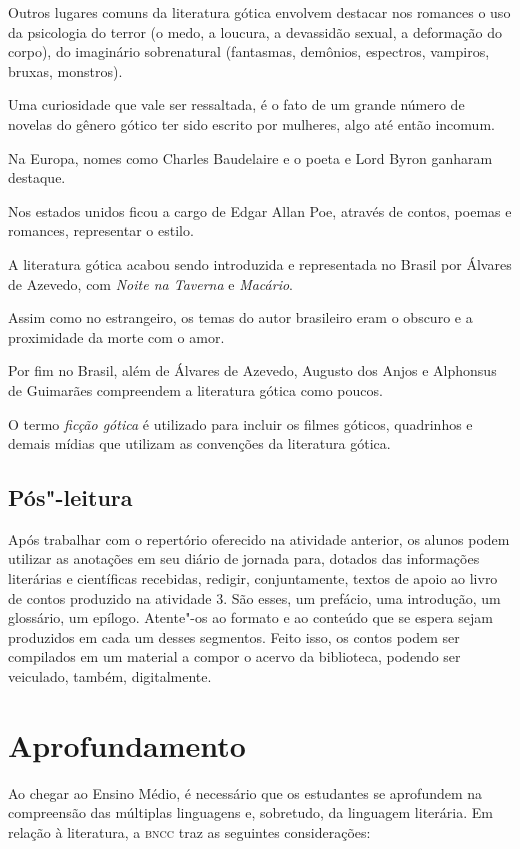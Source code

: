 \documentclass[12pt]{extarticle}
\begin{document}
Outros lugares comuns da literatura gótica envolvem destacar nos
romances o uso da psicologia do terror (o medo, a loucura, a devassidão
sexual, a deformação do corpo), do imaginário sobrenatural (fantasmas,
demônios, espectros, vampiros, bruxas, monstros).

Uma curiosidade que vale ser ressaltada, é o fato de um grande número de
novelas do gênero gótico ter sido escrito por mulheres, algo até então
incomum.

Na Europa, nomes como Charles Baudelaire e o poeta e Lord Byron ganharam
destaque.

Nos estados unidos ficou a cargo de Edgar Allan Poe, através de contos,
poemas e romances, representar o estilo.

A literatura gótica acabou sendo introduzida e representada no Brasil
por Álvares de Azevedo, com \emph{Noite na Taverna} e \emph{Macário}.

Assim como no estrangeiro, os temas do autor brasileiro eram o obscuro e
a proximidade da morte com o amor.~

Por fim no Brasil, além de Álvares de Azevedo, Augusto dos Anjos e
Alphonsus de Guimarães compreendem a literatura gótica como poucos.

O termo \emph{ficção gótica} é utilizado para incluir os filmes góticos,
quadrinhos e demais mídias que utilizam as convenções da literatura
gótica.

\subsection{Pós"-leitura}

Após trabalhar com o repertório oferecido na atividade
anterior, os alunos podem utilizar as anotações em seu diário de jornada
para, dotados das informações literárias e científicas recebidas,
redigir, conjuntamente, textos de apoio ao livro de contos produzido na
atividade 3. São esses, um prefácio, uma introdução, um glossário, um
epílogo. Atente"-os ao formato e ao conteúdo que se espera sejam
produzidos em cada um desses segmentos. Feito isso, os contos podem ser
compilados em um material a compor o acervo da biblioteca, podendo ser
veiculado, também, digitalmente.

\section{Aprofundamento}

Ao chegar ao Ensino Médio, é necessário que os estudantes se aprofundem
na compreensão das múltiplas linguagens e, sobretudo, da linguagem
literária. Em relação à literatura, a \textsc{bncc} traz as seguintes
considerações:
\end{document}
